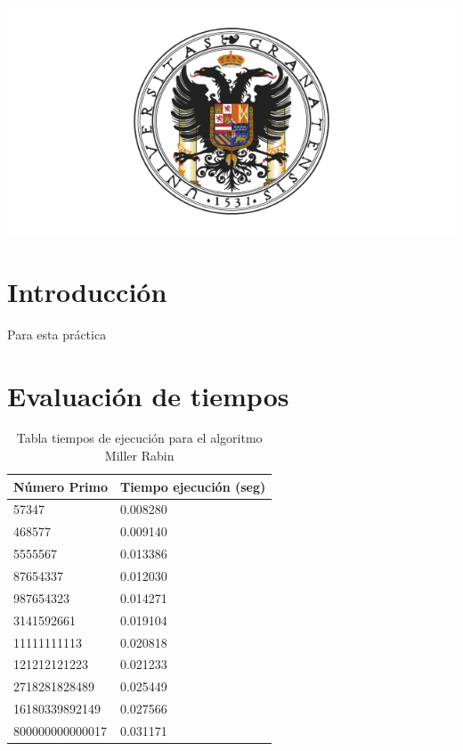 \includegraphics[width=1\linewidth]{ugr}

\newpage %

\tableofcontents %



\newpage


\section*{Introducción}

Para esta práctica 

\section{Evaluación de tiempos}

\begin{table}[htbp]
	\begin{center}
		\begin{tabular}{|l|l|}
			\hline
			\rowcolor{LightCyan}
			Número Primo & Tiempo ejecución (seg) \\ \hline
			57347&  0.008280 \\ \hline 
			468577&  0.009140 \\ \hline 
			5555567&  0.013386 \\ \hline 
			87654337&  0.012030 \\ \hline 
			987654323&  0.014271 \\ \hline 
			3141592661&  0.019104 \\ \hline 
			11111111113&  0.020818 \\ \hline 
			121212121223&  0.021233 \\ \hline 
			2718281828489&  0.025449 \\ \hline 
			16180339892149&  0.027566 \\ \hline 
			800000000000017&  0.031171 \\ \hline 
		\end{tabular}
		\caption{Tabla tiempos de ejecución para el algoritmo Miller Rabin}
		\label{tabla:millerrabin}
	\end{center}
\end{table}


